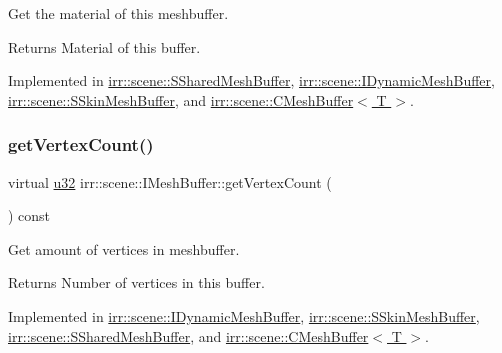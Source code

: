 Get the material of this meshbuffer. 

\begin{DoxyReturn}{Returns}
Material of this buffer. 
\end{DoxyReturn}


Implemented in \hyperlink{structirr_1_1scene_1_1SSharedMeshBuffer_aea6a55293929329800d6299f86b65841}{irr\+::scene\+::\+S\+Shared\+Mesh\+Buffer}, \hyperlink{classirr_1_1scene_1_1IDynamicMeshBuffer_a3be83e4819e9f79a3d9b264eb8bf4cfc}{irr\+::scene\+::\+I\+Dynamic\+Mesh\+Buffer}, \hyperlink{structirr_1_1scene_1_1SSkinMeshBuffer_a0ba6d4da9bbb92c5aa9c7c70225d3eb6}{irr\+::scene\+::\+S\+Skin\+Mesh\+Buffer}, and \hyperlink{classirr_1_1scene_1_1CMeshBuffer_a3e971800b0fc1a67134f839309589e43}{irr\+::scene\+::\+C\+Mesh\+Buffer$<$ T $>$}.

\mbox{\label{classirr_1_1scene_1_1IMeshBuffer_a77ab285c8c886af8ddeb0371db7bde96}} 
\subsubsection{\texorpdfstring{get\+Vertex\+Count()}{getVertexCount()}}
{\footnotesize\ttfamily virtual \hyperlink{namespaceirr_a0416a53257075833e7002efd0a18e804}{u32} irr\+::scene\+::\+I\+Mesh\+Buffer\+::get\+Vertex\+Count (\begin{DoxyParamCaption}{ }\end{DoxyParamCaption}) const\hspace{0.3cm}{\ttfamily [pure virtual]}}



Get amount of vertices in meshbuffer. 

\begin{DoxyReturn}{Returns}
Number of vertices in this buffer. 
\end{DoxyReturn}


Implemented in \hyperlink{classirr_1_1scene_1_1IDynamicMeshBuffer_afc317a8ccda7e7eceb1f4955c90848d2}{irr\+::scene\+::\+I\+Dynamic\+Mesh\+Buffer}, \hyperlink{structirr_1_1scene_1_1SSkinMeshBuffer_a0420d14f4a4317192aa3423c0634d8d8}{irr\+::scene\+::\+S\+Skin\+Mesh\+Buffer}, \hyperlink{structirr_1_1scene_1_1SSharedMeshBuffer_aa50aed87725f3cc745b0f04f0233107b}{irr\+::scene\+::\+S\+Shared\+Mesh\+Buffer}, and \hyperlink{classirr_1_1scene_1_1CMeshBuffer_a72ee778498eff327a20c6be179976994}{irr\+::scene\+::\+C\+Mesh\+Buffer$<$ T $>$}.

